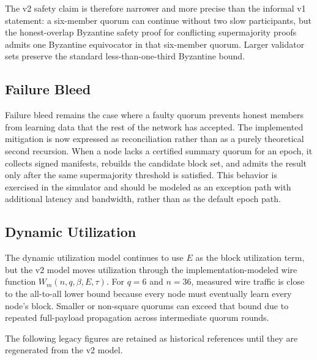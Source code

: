 The v2 safety claim is therefore narrower and more precise than the informal
v1 statement: a six-member quorum can continue without two slow participants,
but the honest-overlap Byzantine safety proof for conflicting supermajority
proofs admits one Byzantine equivocator in that six-member quorum. Larger
validator sets preserve the standard less-than-one-third Byzantine bound.

\subsection{Failure Bleed}\label{proj:fb}

Failure bleed remains the case where a faulty quorum prevents honest members
from learning data that the rest of the network has accepted. The implemented
mitigation is now expressed as reconciliation rather than as a purely
theoretical second recursion. When a node lacks a certified summary quorum for
an epoch, it collects signed manifests, rebuilds the candidate block set, and
admits the result only after the same supermajority threshold is satisfied.
This behavior is exercised in the simulator and should be modeled as an
exception path with additional latency and bandwidth, rather than as the
default epoch path.

\subsection{Dynamic Utilization}\label{proj:dyn_ut}

The dynamic utilization model continues to use \(E\) as the block utilization
term, but the v2 model moves utilization through the implementation-modeled
wire function \(W_m(n,q,\beta,E,\tau)\). For \(q=6\) and \(n=36\), measured
wire traffic is close to the all-to-all lower bound because every node must
eventually learn every node's block. Smaller or non-square quorums can exceed
that bound due to repeated full-payload propagation across intermediate
quorum rounds.

The following legacy figures are retained as historical references until they
are regenerated from the v2 model.






